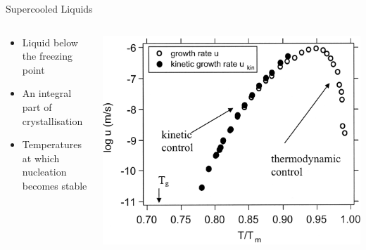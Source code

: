 \documentclass[16pt, aspectratio=43,compress]{beamer}
\begin{document}
\begin{frame}{Supercooled Liquids}
    \begin{columns}
        \begin{column}{0.5\linewidth}
            \begin{itemize}
                \item Liquid below the freezing point
                \item An integral part of crystallisation
                \item Temperatures at which nucleation becomes stable
            \end{itemize}
        \end{column}
        \begin{column}{0.5\linewidth}
            \includegraphics[width=\textwidth]{crystal-growth}
        \end{column}
    \end{columns}
\end{frame}
\end{document}

